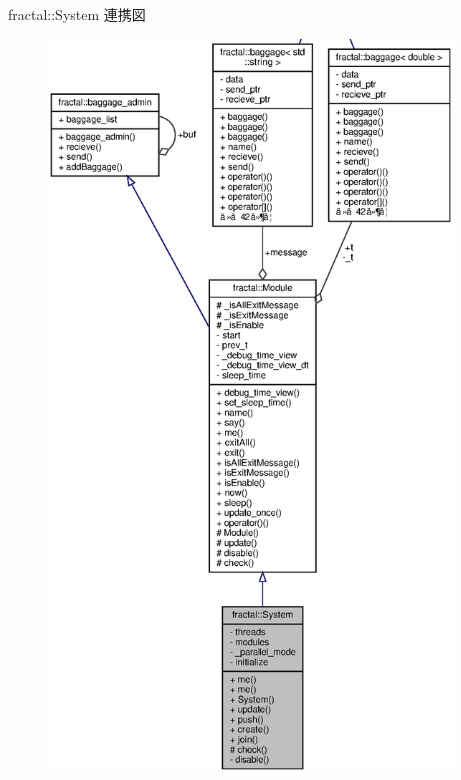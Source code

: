 fractal\+:\+:System 連携図
\nopagebreak
\begin{figure}[H]
\begin{center}
\leavevmode
\includegraphics[height=550pt]{classfractal_1_1System__coll__graph}
\end{center}
\end{figure}
